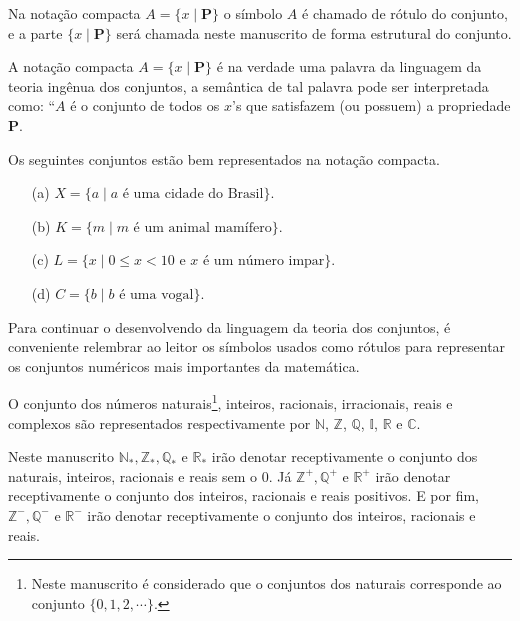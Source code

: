 Na notação compacta $A = \{ x \mid \textbf{P}\}$ o símbolo $A$ é chamado de rótulo do conjunto, e a parte $\{ x \mid \textbf{P}\}$ será chamada neste manuscrito de forma estrutural do conjunto.

\begin{remark}
	A notação compacta $A = \{ x \mid \textbf{P}\}$ é na verdade uma palavra da linguagem da teoria ingênua dos conjuntos, a semântica de tal palavra pode ser interpretada como: ``$A$ é o conjunto de todos os $x$'s que satisfazem (ou possuem) a propriedade $\textbf{P}$.
\end{remark}

\begin{example}\label{exe:conjuntos}
	Os seguintes conjuntos estão bem representados na notação compacta.
	\begin{itemize}
		\item[(a)] $X = \{a \mid a \mbox{ é uma cidade do Brasil}\}$.
		\item[(b)] $K = \{m \mid m \mbox{ é um animal mamífero}\}$.
		\item[(c)] $L = \{x \mid 0 \leq x < 10 \mbox{ e } x \mbox{ é um número impar}\}$.
		\item[(d)] $C = \{b \mid b \mbox{ é uma vogal}\}$.
	\end{itemize}
\end{example}

Para continuar o desenvolvendo da linguagem da teoria dos conjuntos, é conveniente relembrar ao leitor os símbolos usados como rótulos para representar os conjuntos numéricos mais importantes da matemática.

\begin{definition}\label{def:SimbolosConjuntos}
	O conjunto dos números naturais\footnote{Neste manuscrito é considerado que o conjuntos dos naturais corresponde ao conjunto $\{0, 1, 2, \cdots\}$.}, inteiros, racionais, irracionais, reais e complexos são representados respectivamente por   $\mathbb{N}$, $\mathbb{Z}$,  $\mathbb{Q}$,  $\mathbb{I}$,  $\mathbb{R}$ e  $\mathbb{C}$.
\end{definition}

\begin{remark}
	Neste manuscrito $\mathbb{N}_*, \mathbb{Z}_*, \mathbb{Q}_*$ e $\mathbb{R}_*$ irão denotar receptivamente o conjunto dos naturais, inteiros, racionais e reais sem o $0$. Já $\mathbb{Z}^+, \mathbb{Q}^+$ e $\mathbb{R}^+$ irão denotar receptivamente o conjunto dos inteiros, racionais e reais positivos. E por fim, $\mathbb{Z}^-, \mathbb{Q}^-$ e $\mathbb{R}^-$ irão denotar receptivamente o conjunto dos inteiros, racionais e reais.
\end{remark}

